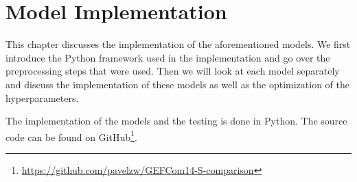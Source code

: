 \chapter{Model Implementation}
\label{ch:model-implementation}

This chapter discusses the implementation of the 
aforementioned models. We first introduce the 
Python framework used in the implementation and go 
over the preprocessing steps that were used. 
Then we will look at each model separately and discuss the implementation 
of these models as well as the optimization of the hyperparameters.

The implementation of the models and the testing is done in Python. 
The source code can be found on 
GitHub\footnote{\url{https://github.com/pavelzw/GEFCom14-S-comparison}}.











